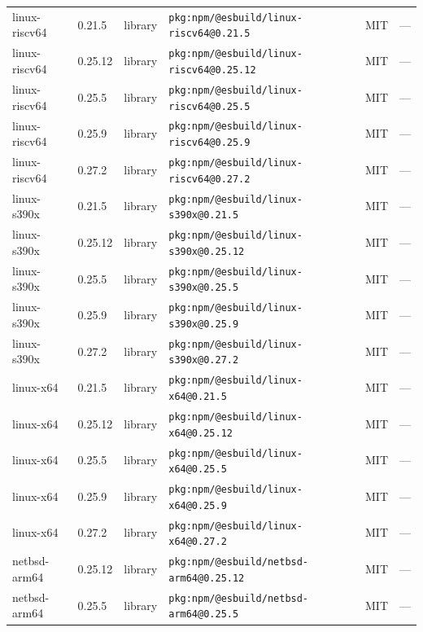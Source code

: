 \documentclass[11pt,a4paper]{article}
\begin{document}
\begin{longtable}{|p{4cm}|p{2cm}|p{1.6cm}|p{5cm}|p{1.5cm}|p{3.5cm}|}
\raggedright linux-riscv64 & 0.21.5 & library & \small\texttt{pkg:npm/@esbuild/linux-riscv64@0.21.5} & MIT & \small — \\
\raggedright linux-riscv64 & 0.25.12 & library & \small\texttt{pkg:npm/@esbuild/linux-riscv64@0.25.12} & MIT & \small — \\
\raggedright linux-riscv64 & 0.25.5 & library & \small\texttt{pkg:npm/@esbuild/linux-riscv64@0.25.5} & MIT & \small — \\
\raggedright linux-riscv64 & 0.25.9 & library & \small\texttt{pkg:npm/@esbuild/linux-riscv64@0.25.9} & MIT & \small — \\
\raggedright linux-riscv64 & 0.27.2 & library & \small\texttt{pkg:npm/@esbuild/linux-riscv64@0.27.2} & MIT & \small — \\
\raggedright linux-s390x & 0.21.5 & library & \small\texttt{pkg:npm/@esbuild/linux-s390x@0.21.5} & MIT & \small — \\
\raggedright linux-s390x & 0.25.12 & library & \small\texttt{pkg:npm/@esbuild/linux-s390x@0.25.12} & MIT & \small — \\
\raggedright linux-s390x & 0.25.5 & library & \small\texttt{pkg:npm/@esbuild/linux-s390x@0.25.5} & MIT & \small — \\
\raggedright linux-s390x & 0.25.9 & library & \small\texttt{pkg:npm/@esbuild/linux-s390x@0.25.9} & MIT & \small — \\
\raggedright linux-s390x & 0.27.2 & library & \small\texttt{pkg:npm/@esbuild/linux-s390x@0.27.2} & MIT & \small — \\
\raggedright linux-x64 & 0.21.5 & library & \small\texttt{pkg:npm/@esbuild/linux-x64@0.21.5} & MIT & \small — \\
\raggedright linux-x64 & 0.25.12 & library & \small\texttt{pkg:npm/@esbuild/linux-x64@0.25.12} & MIT & \small — \\
\raggedright linux-x64 & 0.25.5 & library & \small\texttt{pkg:npm/@esbuild/linux-x64@0.25.5} & MIT & \small — \\
\raggedright linux-x64 & 0.25.9 & library & \small\texttt{pkg:npm/@esbuild/linux-x64@0.25.9} & MIT & \small — \\
\raggedright linux-x64 & 0.27.2 & library & \small\texttt{pkg:npm/@esbuild/linux-x64@0.27.2} & MIT & \small — \\
\raggedright netbsd-arm64 & 0.25.12 & library & \small\texttt{pkg:npm/@esbuild/netbsd-arm64@0.25.12} & MIT & \small — \\
\raggedright netbsd-arm64 & 0.25.5 & library & \small\texttt{pkg:npm/@esbuild/netbsd-arm64@0.25.5} & MIT & \small — \\

\end{longtable}
\end{document}
